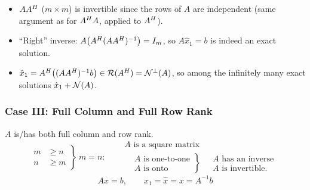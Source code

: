\begin{insight}
\begin{itemize}[nosep,leftmargin=1.2em]
\item $AA^{H}$ ($m\times m$) is invertible since the rows of $A$ are independent (same argument as for $A^{H} A$, applied to $A^{H}$).
\item ``Right'' inverse: $A\big(A^{H}(AA^{H})^{-1}\big)=I_m$, so $A\hat x_1=b$ is indeed an exact solution.
\item $\hat x_1=A^{H}\big((AA^{H})^{-1}b\big)\in\mathcal{R}(A^{H})=\mathcal{N}^\perp(A)$, so  among the infinitely many exact solutions $\hat x_1+\mathcal{N}(A)$.
\end{itemize}
\end{insight}

\subsubsection{Case III: Full Column and Full Row Rank}
$A$ is/has both full column and row rank.
\[
\left.\begin{aligned}m&\geq n\\ n&\geq m\end{aligned}\right\}\ m=n:\quad
\begin{aligned}
&A\text{ is a square matrix}\\
&\left.\begin{aligned}&A\text{ is one-to-one}\\&A\text{ is onto}\end{aligned}\right\}
\ \begin{aligned}&A\text{ has an inverse}\\&A\text{ is invertible.}\end{aligned}
\end{aligned}
\]
\[
Ax=b,\qquad x_1=\hat{x}=x=A^{-1}b
\]

